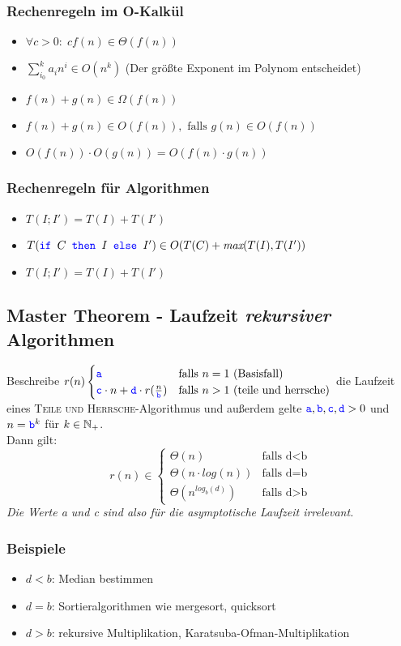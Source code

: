 \subsubsection{Rechenregeln im O-Kalkül}
\begin{itemize}
    \item $\forall c > 0:\;cf(n)\in\Theta(f(n))$
    \item $\displaystyle{\sum^k_{i_0}}a_in^i\in O(n^k)$ \qquad (Der größte Exponent im Polynom entscheidet)
    \item $f(n)+g(n)\in\Omega(f(n))$
    \item $f(n)+g(n)\in O(f(n)), \text{ falls }g(n)\in O(f(n))$
    \item $O(f(n)) \cdot O(g(n)) = O(f(n)\cdot g(n))$
\end{itemize}

\subsubsection{Rechenregeln für Algorithmen}
\begin{itemize}
    \item $T(I;I') = T(I) + T(I')$
    \item $T(\textcolor{blue}{\texttt{if }}C\textcolor{blue}{\texttt{ then }} I \textcolor{blue}{\texttt{ else }} I') \in O(T(C)+\textit{max}(T(I), T(I'))$
    \item $T(I;I') = T(I) + T(I')$
\end{itemize}

\subsection{Master Theorem - Laufzeit \textit{rekursiver} Algorithmen}
Beschreibe $r(n)\begin{cases}
\textcolor{blue}{\texttt{a}} & \text{falls }n=1\text{ (Basisfall)}\\
\textcolor{blue}{\texttt{c}}\cdot n+\textcolor{blue}{\texttt{d}}\cdot r(\frac{n}{\textcolor{blue}{\texttt{b}}}) & \text{falls }n>1\text{ (teile und herrsche)}
\end{cases}$ die Laufzeit eines \textsc{Teile und Herrsche}-Algorithmus und außerdem gelte $\textcolor{blue}{\texttt{a}}, \textcolor{blue}{\texttt{b}}, \textcolor{blue}{\texttt{c}}, \textcolor{blue}{\texttt{d}}>0$ und $n=\textcolor{blue}{\texttt{b}}^k$ für $k\in\mathbb{N_+}$.\\
Dann gilt:
\[
    r(n)\in\begin{cases}
        \Theta(n)&\text{falls d<b}\\
        \Theta(n\cdot log(n))&\text{falls d=b}\\
        \Theta(n^{log_b(d)})&\text{falls d>b}
    \end{cases}
\]
\textit{Die Werte a und c sind also für die asymptotische Laufzeit irrelevant.}
\subsubsection{Beispiele}
\begin{itemize}
    \item $d<b$: Median bestimmen\\
    \item $d=b$: Sortieralgorithmen wie mergesort, quicksort\\
    \item $d>b$: rekursive Multiplikation, Karatsuba-Ofman-Multiplikation
\end{itemize}